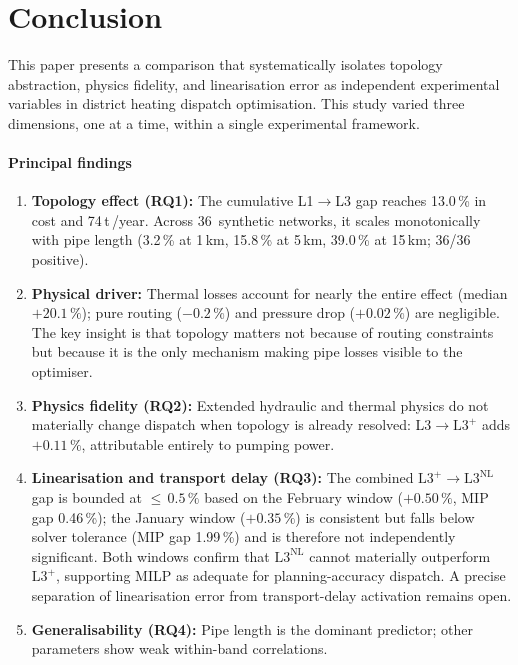 \documentclass[a4paper,fleqn]{cas-dc}
\newcommand{\Lplus}{\mathrm{L3}^{+}}
\newcommand{\Lnl}{\mathrm{L3}^{\mathrm{NL}}}
\begin{document}
\section{Conclusion}
\label{sec:conclusion}

This paper presents a comparison that systematically
isolates topology abstraction, physics fidelity, and linearisation
error as independent experimental variables in district heating
dispatch optimisation. This study varied three dimensions, one at a time, within a
single experimental framework.

\paragraph{Principal findings}
\begin{enumerate}[nosep]
  \item \textbf{Topology effect (RQ1):} The cumulative L1$\to$L3
        gap reaches 13.0\,\% in cost and 74\,t\,/year.
        Across 36~synthetic networks, it scales monotonically
        with pipe length (3.2\,\% at 1\,km, 15.8\,\% at 5\,km,
        39.0\,\% at 15\,km; 36/36 positive).
  \item \textbf{Physical driver:} Thermal losses account for
        nearly the entire effect (median $+20.1\,\%$); pure
        routing ($-0.2\,\%$) and pressure drop ($+0.02\,\%$)
        are negligible. The key insight is that topology matters
        not because of routing constraints but because it is the
        only mechanism making pipe losses visible to the optimiser.
  \item \textbf{Physics fidelity (RQ2):}
        Extended hydraulic and thermal physics do not materially
        change dispatch when topology is already resolved:
        L3$\to\Lplus$ adds $+0.11\,\%$, attributable entirely
        to pumping power.
   \item \textbf{Linearisation and transport delay (RQ3):}
        The combined $\Lplus\to\Lnl$ gap is bounded at
        ${\leq}\,0.5\,\%$ based on the February window
        ($+0.50\,\%$, MIP gap 0.46\,\%); the January window
        ($+0.35\,\%$) is consistent but falls below solver
        tolerance (MIP gap 1.99\,\%) and is therefore not
        independently significant. Both windows confirm that
        $\Lnl$ cannot materially outperform $\Lplus$, supporting
        MILP as adequate for planning-accuracy dispatch. A precise
        separation of linearisation error from transport-delay
        activation remains open.
  \item \textbf{Generalisability (RQ4):} Pipe length is the
        dominant predictor; other parameters show weak
        within-band correlations.
\end{enumerate}
\end{document}
